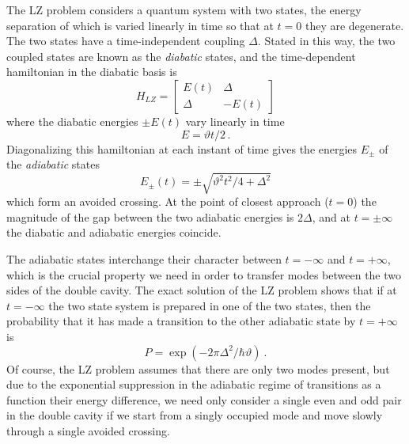 \documentclass[twocolumn,english,pra,aps,superscriptaddress,floatfix]{revtex4-1}
\begin{document}
The LZ problem considers a quantum system with two states, the energy separation of which is varied linearly in time so that at $t=0$ they are degenerate. The two states have a time-independent coupling $\Delta$. Stated in this way, the two coupled states are known as the \emph{diabatic} states, and the time-dependent hamiltonian in the diabatic basis is
\begin{equation}
H_{LZ}=\left[\begin{array}{cc}
E(t) & \Delta\\
\Delta & -E(t) \end{array}\right]
\label{LZ-Hamiltonian}
\end{equation}
where the diabatic energies $\pm E(t)$ vary linearly in time 
\begin{equation}
E = \vartheta t/2 \, . 
\end{equation}
Diagonalizing this hamiltonian at each instant of time gives the energies $E_{\pm}$ of the \emph{adiabatic} states 
\begin{equation}
E_{\pm}(t)=\pm \sqrt{\vartheta^2 t^2/4 + \Delta^2}
\end{equation}
which form an avoided crossing. At the point of closest approach ($t=0$) the magnitude of the gap between the two adiabatic energies is $2 \Delta$, and  at $t=\pm \infty$ the diabatic and adiabatic energies coincide.

The adiabatic states interchange their character between $t=-\infty$ and $t=+\infty$, which is the crucial property we need in order to transfer modes between the two sides of the double cavity. The exact solution of the LZ problem shows that if at $t = - \infty$ the two state system is prepared in one of the two states, then the probability that it has made a transition to the other adiabatic state by $t=+\infty$ is  \cite{landau32,zener32,stenholm96} 
\begin{equation}
P=\exp(-  2 \pi \Delta^2/ \hbar \vartheta ) \ .
\label{eq:LZprobability}
\end{equation}
Of course, the LZ problem assumes that there are only two modes present, but due to the exponential suppression in the adiabatic regime of transitions as a function their energy difference, we need only consider a single even and odd pair in the double cavity if we start from a singly occupied mode and move slowly through a single avoided crossing.    
\end{document}
